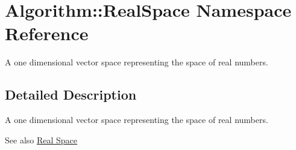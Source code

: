 \hypertarget{namespaceAlgorithm_1_1RealSpace}{}\section{Algorithm\+:\+:Real\+Space Namespace Reference}
\label{namespaceAlgorithm_1_1RealSpace}


A one dimensional vector space representing the space of real numbers.  




\subsection{Detailed Description}
A one dimensional vector space representing the space of real numbers. 

\begin{DoxySeeAlso}{See also}
\hyperlink{group__RealGroup}{Real Space} 
\end{DoxySeeAlso}
